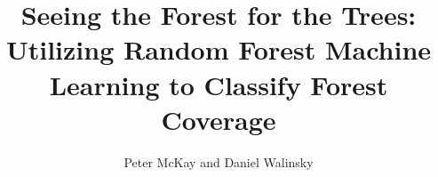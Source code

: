 \documentclass[twoside,letterpaper]{soups}
\begin{document}
%


\title{\Large \bf Seeing the Forest for the Trees: \\
Utilizing Random Forest Machine Learning to Classify Forest Coverage
}
\author{
Peter McKay and Daniel Walinsky\\
\\
\\
}
\maketitle












\end{document}

